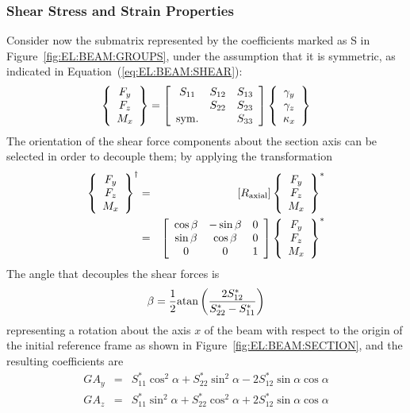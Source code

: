\subsubsection{Shear Stress and Strain Properties}
Consider now the submatrix represented by the coefficients 
marked as S in Figure~\ref{fig:EL:BEAM:GROUPS}, under the assumption 
that it is symmetric, as indicated in Equation~(\ref{eq:EL:BEAM:SHEAR}):
\begin{equation}
	\cubr{\cvvect{
		F_y \\
		F_z \\
		M_x
	}} = \sqbr{\matr{ccc}{
		S_{11} & S_{12} & S_{13} \\
		 & S_{22} & S_{23} \\
		\llk{sym.} & & S_{33}
	}}\cubr{\cvvect{
		\gamma_y \\
		\gamma_z \\
		\kappa_x
	}}
	\label{eq:EL:BEAM:SHEAR}
\end{equation}
The orientation of the shear force components about the section axis
can be selected in order to decouple them; by applying the transformation
\begin{eqnarray}
	\cubr{\cvvect{
		F_y \\
		F_z \\
		M_x
	}}^{\dagger}
	& = & \sqbr{R_{\llk{axial}}}\cubr{\cvvect{
		F_y \\
		F_z \\
		M_x
	}}^*
	\nonumber \\
	& = & \sqbr{\matr{ccc}{
		\cos\beta & -\sin\beta & 0 \\
		\sin\beta & \cos\beta & 0 \\
		0 & 0 & 1
	}}\cubr{\cvvect{
		F_y \\
		F_z \\
		M_x
	}}^*
	\label{eq:EL:BEAM:SHEAR-ROTATION}
\end{eqnarray}
The angle that decouples the shear forces is
\begin{equation*}
	\beta = \frac{1}{2}\mathrm{atan}\left( \frac{2 S_{12}^*}{S_{22}^* - S_{11}^*} \right)
\end{equation*}
representing a rotation about the axis $x$ of the beam with respect
to the origin of the initial reference frame as shown 
in Figure~\ref{fig:EL:BEAM:SECTION},
and the resulting coefficients are
\begin{eqnarray}
	GA_y & = & S_{11}^* \cos^2\alpha + S_{22}^* \sin^2\alpha
		- 2 S_{12}^* \sin\alpha \cos\alpha \\
	GA_z & = & S_{11}^* \sin^2\alpha + S_{22}^* \cos^2\alpha
		+ 2 S_{12}^* \sin\alpha \cos\alpha
\end{eqnarray}
